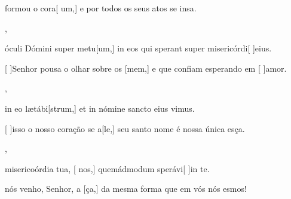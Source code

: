 {    {\item {} formou o cora[ um,] e por todos os seus atos se insa.~\Antiphona},
  {\item {} óculi Dómini super metu[um,] in eos qui sperant super misericórdi[ ]{e}ius.~\Antiphona}%
    {\item {}[ ]{Se}nhor pousa o olhar sobre os [mem,] e que confiam esperando em [ ]{a}mor.~\Antiphona},
  {\item {} in eo lætábi[strum,] et in nómine sancto eius vimus.~\Antiphona}%
    {\item {}[ ]{is}so o nosso coração se a[le,] seu santo nome é nossa única esça.~\Antiphona},
  {\item {} misericoórdia tua, [ nos,] quemádmodum sperávi[ ]{in} te.~\Antiphona}%
    {\item {} nós venho, Senhor, a [ça,] da mes\-ma forma que em vós nós esmos!~\Antiphona}
}